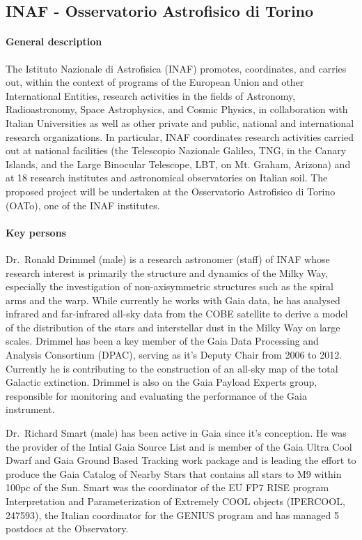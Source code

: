 \subsection{INAF - Osservatorio Astrofisico di Torino}
\label{sec:inaf}

\paragraph{General description}

The Istituto Nazionale di Astrofisica (INAF) promotes, coordinates, and carries out, within the context of programs of the European Union and other International Entities, research activities in the fields of Astronomy, Radioastronomy, Space Astrophysics, and Cosmic Physics, in collaboration with Italian Universities as well as other private and public, national and international research organizations. In particular, INAF coordinates research activities carried out at national facilities (the Telescopio Nazionale Galileo, TNG, in the Canary Islands, and the Large Binocular Telescope, LBT, on Mt. Graham, Arizona) and at 18 research institutes and astronomical observatories on Italian soil. The proposed project will be undertaken at the Osservatorio Astrofisico di Torino (OATo), one of the INAF institutes. 

\paragraph{Key persons}

Dr.~Ronald Drimmel (male) is a research astronomer (staff) of INAF whose research interest is primarily the structure and dynamics of the Milky Way, especially the investigation of non-axisymmetric structures such as the spiral arms and the warp. While currently he works with Gaia data, he has analysed infrared and far-infrared all-sky data from the COBE satellite to derive a model of the distribution of the stars and interstellar dust in the Milky Way on large scales. Drimmel has been a key member of the Gaia Data Processing and Analysis Consortium (DPAC), serving as it's Deputy Chair from 2006 to 2012. Currently he is contributing to the construction of an all-sky map of the total Galactic extinction. Drimmel is also on the Gaia Payload Experts group, responsible for monitoring and evaluating the performance of the Gaia instrument.

Dr.~Richard Smart (male) has been active in Gaia since it's conception. He was the provider of the Intial Gaia Source List and is member of the Gaia Ultra Cool Dwarf and Gaia Ground Based Tracking work package and is leading the effort to produce the Gaia Catalog of Nearby Stars that contains all stars to M9 within 100pc of the Sun. Smart was the coordinator of the EU FP7 RISE program Interpretation and Parameterization of Extremely COOL objects (IPERCOOL, 247593), the Italian coordinator for the GENIUS  program and has managed 5 postdocs at the Observatory. 

